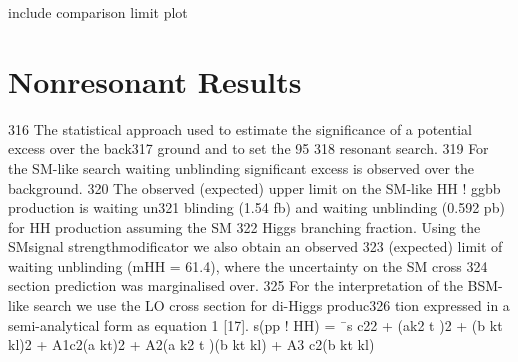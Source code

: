 include comparison limit plot

\section{Nonresonant Results\label{sec:nonresresults}}

316 The statistical approach used to estimate the significance of a potential excess over the back317
ground and to set the 95%
318 resonant search.
319 For the SM-like search waiting unblinding significant excess is observed over the background.
320 The observed (expected) upper limit on the SM-like HH ! ggbb production is waiting un321
blinding (1.54 fb) and waiting unblinding (0.592 pb) for HH production assuming the SM
322 Higgs branching fraction. Using the SMsignal strengthmodificator we also obtain an observed
323 (expected) limit of waiting unblinding (mHH = 61.4), where the uncertainty on the SM cross
324 section prediction was marginalised over.
325 For the interpretation of the BSM-like search we use the LO cross section for di-Higgs produc326
tion expressed in a semi-analytical form as equation 1 [17].
s(pp ! HH) = ¯s
c22
+ (ak2
t )2 + (b kt kl)2 + A1c2(a kt)2 + A2(a k2
t )(b kt kl) + A3 c2(b kt kl)





